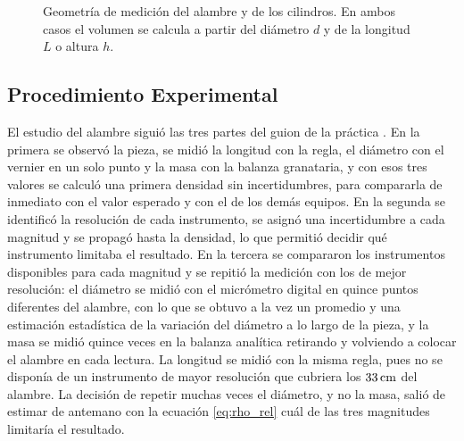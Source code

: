 \begin{figure}[H]
    \centering
    \caption{Geometría de medición del alambre y de los cilindros. En ambos casos el volumen se calcula a partir del diámetro $d$ y de la longitud $L$ o altura $h$.}
    \label{fig:esquema}
\end{figure}

\subsection{Procedimiento Experimental}

El estudio del alambre siguió las tres partes del guion de la práctica \cite{practica}. En la primera se observó la pieza, se midió la longitud con la regla, el diámetro con el vernier en un solo punto y la masa con la balanza granataria, y con esos tres valores se calculó una primera densidad sin incertidumbres, para compararla de inmediato con el valor esperado y con el de los demás equipos. En la segunda se identificó la resolución de cada instrumento, se asignó una incertidumbre a cada magnitud y se propagó hasta la densidad, lo que permitió decidir qué instrumento limitaba el resultado. En la tercera se compararon los instrumentos disponibles para cada magnitud y se repitió la medición con los de mejor resolución: el diámetro se midió con el micrómetro digital en quince puntos diferentes del alambre, con lo que se obtuvo a la vez un promedio y una estimación estadística de la variación del diámetro a lo largo de la pieza, y la masa se midió quince veces en la balanza analítica retirando y volviendo a colocar el alambre en cada lectura. La longitud se midió con la misma regla, pues no se disponía de un instrumento de mayor resolución que cubriera los $33\,\mathrm{cm}$ del alambre. La decisión de repetir muchas veces el diámetro, y no la masa, salió de estimar de antemano con la ecuación \eqref{eq:rho_rel} cuál de las tres magnitudes limitaría el resultado.

